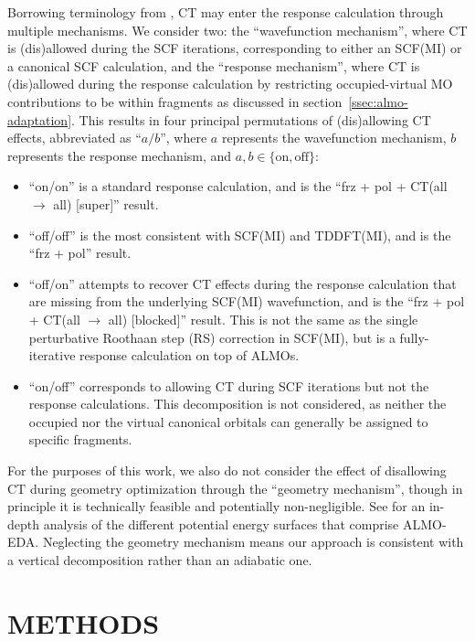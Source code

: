 \documentclass[%
  class = book,%
  crop = false,%
  float = true,%
  multi = true,%
  preview = false,%
]{standalone}
\newcommand{\caps}[1]{\uppercase{#1}}
\begin{document}
Borrowing terminology from , CT may enter the response calculation through multiple mechanisms. We consider two: the ``wave\-function mechanism'', where CT is (dis)\-allowed during the SCF iterations, corresponding to either an SCF(MI) or a canonical SCF calculation, and the ``response mechanism'', where CT is (dis)\-allowed during the response calculation by restricting occupied-virtual MO contributions to be within fragments as discussed in section~\ref{ssec:almo-adaptation}. This results in four principal permutations of (dis)\-allowing CT effects, abbreviated as ``\(a/b\)'', where \(a\) represents the wavefunction mechanism, \(b\) represents the response mechanism, and \(a,b\in\{\text{on},\text{off}\}\):

\begin{itemize}
\item ``on/on'' is a standard response calculation, and is the ``frz + pol + CT(all \(\rightarrow\) all) [super]'' result.
\item ``off/off'' is the most consistent with SCF(MI) and TDDFT(MI), and is the ``frz + pol'' result.
\item ``off/on'' attempts to recover CT effects during the response calculation that are missing from the underlying SCF(MI) wavefunction, and is the ``frz + pol + CT(all \(\rightarrow\) all) [blocked]'' result. This is not the same as the single perturbative Roothaan step (RS) correction in SCF(MI), but is a fully-iterative response calculation on top of ALMOs.
\item ``on/off'' corresponds to allowing CT during SCF iterations but not the response calculations. This decomposition is not considered, as neither the occupied nor the virtual canonical orbitals can generally be assigned to specific fragments.
\end{itemize}

For the purposes of this work, we also do not consider the effect of disallowing CT during geometry optimization through the ``geometry mechanism'', though in principle it is technically feasible and potentially non-negligible. See  for an in-depth analysis of the different potential energy surfaces that comprise ALMO-EDA. Neglecting the geometry mechanism means our approach is consistent with a vertical decomposition rather than an adiabatic one.

\section{\texorpdfstring{\caps{Methods}}{Methods}}
\label{sec:methods}
\end{document}
